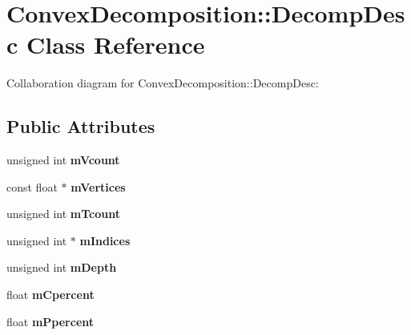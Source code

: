 \hypertarget{class_convex_decomposition_1_1_decomp_desc}{\section{Convex\+Decomposition\+:\+:Decomp\+Desc Class Reference}
\label{class_convex_decomposition_1_1_decomp_desc}
}


Collaboration diagram for Convex\+Decomposition\+:\+:Decomp\+Desc\+:
\subsection*{Public Attributes}
\begin{DoxyCompactItemize}
\item 
\hypertarget{class_convex_decomposition_1_1_decomp_desc_ad29b91a963df41cefa7235201323f3b4}{unsigned int {\bfseries m\+Vcount}}\label{class_convex_decomposition_1_1_decomp_desc_ad29b91a963df41cefa7235201323f3b4}

\item 
\hypertarget{class_convex_decomposition_1_1_decomp_desc_a0f8347667402ee1c78be17a8e7e73e2b}{const float $\ast$ {\bfseries m\+Vertices}}\label{class_convex_decomposition_1_1_decomp_desc_a0f8347667402ee1c78be17a8e7e73e2b}

\item 
\hypertarget{class_convex_decomposition_1_1_decomp_desc_a96c4557cd6f3c0868cf231f152ed1fb4}{unsigned int {\bfseries m\+Tcount}}\label{class_convex_decomposition_1_1_decomp_desc_a96c4557cd6f3c0868cf231f152ed1fb4}

\item 
\hypertarget{class_convex_decomposition_1_1_decomp_desc_a030c95c09800d3cdcd03c7180450f4a4}{unsigned int $\ast$ {\bfseries m\+Indices}}\label{class_convex_decomposition_1_1_decomp_desc_a030c95c09800d3cdcd03c7180450f4a4}

\item 
\hypertarget{class_convex_decomposition_1_1_decomp_desc_ad4eddfbbbb168d591d351935dc56b3e4}{unsigned int {\bfseries m\+Depth}}\label{class_convex_decomposition_1_1_decomp_desc_ad4eddfbbbb168d591d351935dc56b3e4}

\item 
\hypertarget{class_convex_decomposition_1_1_decomp_desc_aeaeb0530e55390a315656ea93979be5b}{float {\bfseries m\+Cpercent}}\label{class_convex_decomposition_1_1_decomp_desc_aeaeb0530e55390a315656ea93979be5b}

\item 
\hypertarget{class_convex_decomposition_1_1_decomp_desc_a8a43f17357737275d5a002c494c8d36f}{float {\bfseries m\+Ppercent}}\label{class_convex_decomposition_1_1_decomp_desc_a8a43f17357737275d5a002c494c8d36f}


\end{DoxyCompactItemize}
